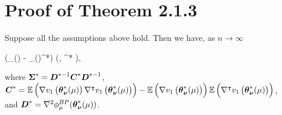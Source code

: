 \section{Proof of Theorem 2.1.3}
\begin{theorem}
	Suppose all the assumptions above hold. Then we have, as $n\to \infty$
	\begin{flalign*}
	\lt(\wh{\bs{\theta}}_{\bs{\nu}}(\mu) - \bs{\theta}_{\bs{\nu}}(\mu)^*\rt)  \lt(, \bs{\Sigma}^* \rt),
	\end{flalign*}
	where $\boldsymbol{\Sigma}^* = \boldsymbol{D}^{*-1}\boldsymbol{C}^{*}\boldsymbol{D}^{*-1}$, 	\\$\boldsymbol{C}^* =\mathbb{E}\left( \nabla v_1\left(\boldsymbol{\theta}^*_{\boldsymbol{\nu}}(\mu)\right)\nabla^{\intercal} v_1\left(\boldsymbol{\theta}^*_{\boldsymbol{\nu}}(\mu)\right) \right) - \mathbb{E}\left(\nabla v_1\left(\boldsymbol{\theta}^*_{\boldsymbol{\nu}}(\mu)\right)\right) \mathbb{E}\left(\nabla^{\intercal} v_1\left(\boldsymbol{\theta}^*_{\boldsymbol{\nu}}(\mu)\right)\right)$,\\
	and $\boldsymbol{D}^*  =  \nabla^2 \phi^{BP}_{\mu}(\boldsymbol{\theta}^*_{\boldsymbol{\nu}}(\mu))$.
\end{theorem}
